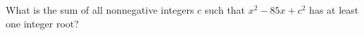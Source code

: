 What is the sum of all nonnegative integers $c$ such that $x^2-85x+c^2$ has at least one integer root?

